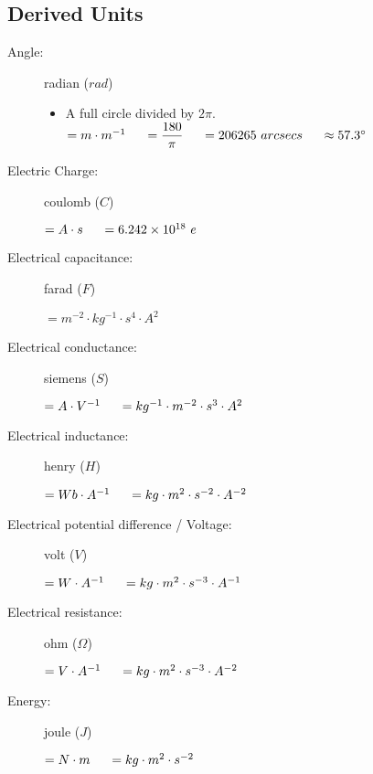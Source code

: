 \subsection{Derived Units}
\begin{description}				

\item[Angle:] radian ($rad$)
\begin{itemize}
\item A full circle divided by $2\pi.$
\items $= m\cdot m^{-1} \tab[0.5cm]= \dfrac{180}{\pi} \tab[0.5cm]= 206265\ arcsecs \tab[0.5cm]\approx 57.3 \degrees$                    
\end{itemize}				

\item[Electric Charge:] coulomb ($C$)
\begin{itemize}
\items $= A\cdot s \tab[0.5cm]= 6.242\times 10^{18}\ e$
\end{itemize}	

\item[Electrical capacitance:] farad ($F$)
\begin{itemize}
\items $=  m^{-2} \cdot kg^{-1} \cdot  s^4 \cdot A^2$
\end{itemize}				

\item[Electrical conductance:] siemens ($S$)
\begin{itemize}
\items $= A \cdot V^{-1} \tab[0.5cm]= kg^{-1} \cdot m^{-2} \cdot s^3 \cdot A^2$
\end{itemize}

\item[Electrical inductance:] henry ($H$)
\begin{itemize}
\items $= Wb\cdot A^{-1}\tab[0.5cm]= kg \cdot m^2 \cdot s^{-2} \cdot A^{-2}$
\end{itemize}	

\item[Electrical potential difference / Voltage:] volt ($V$)
\begin{itemize}
\items $= W \cdot A^{-1} \tab[0.5cm]= kg \cdot m^{2} \cdot s^{-3} \cdot A^{-1}$
\end{itemize}			

\item[Electrical resistance:] ohm ($\Omega$)
\begin{itemize}
\items $= V\cdot A^{-1} \tab[0.5cm]= kg \cdot m^{2} \cdot s^{-3} \cdot A^{-2}$
\end{itemize}

\item[Energy:] joule ($J$)
\begin{itemize}
\items $= N \cdot m \tab[0.5cm]= kg \cdot m^{2} \cdot s^{-2}$
\end{itemize}


\end{description}
